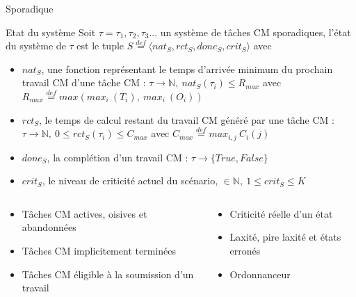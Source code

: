 \documentclass{bredelebeamer}
\begin{document}
\begin{frame}{Sporadique}

\begin{block}{Etat du système}
Soit $\tau = \tau_1, \tau_2, \tau_3 ...$ un système de tâches CM sporadiques, l'état du système de $\tau$ est le tuple $S \overset{def}{=} \langle nat_S, rct_S, done_S, crit_S \rangle$ avec

\begin{itemize}
\item $nat_S$, une fonction représentant le temps d'arrivée minimum du prochain travail CM d'une tâche CM : $\tau \rightarrow \mathbb{N},\ nat_S(\tau_i) \leq R_{max}$ avec $R_{max} \overset{def}{=} max(max_i\ (T_i),\ max_i\ (O_i))$
\item $rct_S$, le temps de calcul restant du travail CM généré par une tâche CM : $ \tau \rightarrow \mathbb{N},\ 0 \leq rct_S(\tau_i) \leq C_{max}$ avec $C_{max} \overset{def}{=} max_{i,j}\ C_i(j)$
\item $done_S$, la complétion d'un travail CM : $ \tau \rightarrow \{True,False\}$
\item $crit_S$, le niveau de criticité actuel du scénario, $ \in \mathbb{N},\ 1 \leq crit_S \leq K$\\
\end{itemize}
\end{block}

\begin{block}{}
\begin{columns}
\begin{column}{0.6\textwidth}
\begin{itemize}
\item Tâches CM actives, oisives et abandonnées
\item Tâches CM implicitement terminées
\item Tâches CM éligible à la soumission d'un travail
\end{itemize}
\end{column}
\begin{column}{0.4\textwidth}
\begin{itemize}
\item Criticité réelle d'un état
\item Laxité, pire laxité et états erronés
\item Ordonnanceur
\end{itemize}
\end{column}
\end{columns}
\end{block}

\end{frame}
\end{document}
